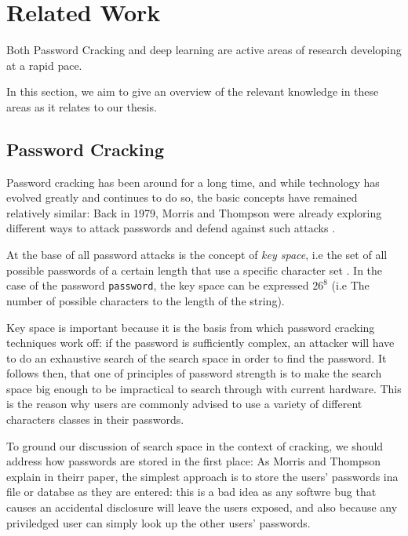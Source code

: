 
\section{Related Work}
Both Password Cracking and deep learning are active areas of research developing at a rapid pace.

In this section, we aim to give an overview of the relevant knowledge in these areas as it relates to our thesis.

\subsection{Password Cracking}
Password cracking has been around for a long time, and while technology has evolved greatly and continues to do so, the basic concepts have remained relatively similar:
Back in 1979, Morris and Thompson were already exploring different ways to attack passwords and defend against such attacks \cite{Thompson1979}.

At the base of all password attacks is the concept of \emph{key space}, i.e the set of all possible passwords of a certain length that use a specific character set \cite{Thompson1979,hash_cat_mask_attack}. 
In the case of the password \texttt{password}, the key space can be expressed $26^8$ (i.e The number of possible characters to the length of the string).

Key space is important because it is the basis from which password cracking techniques work off: if the password is sufficiently complex, an attacker will have to do an exhaustive search of the search space in order to find the password. 
It follows then, that one of principles of password strength is to make the search space big enough to be impractical to search through with current hardware.
This is the reason why users are commonly advised to use a variety of different characters classes in their passwords.

To ground our discussion of search space in the context of cracking, we should address how passwords are stored in the first place: As Morris and Thompson explain in theirr paper, the simplest approach is to store the users' passwords ina file or databse as they are entered: this is a bad idea as any softwre bug that causes an accidental disclosure will leave the users exposed, and also because any priviledged user can simply look up the other users' passwords.

